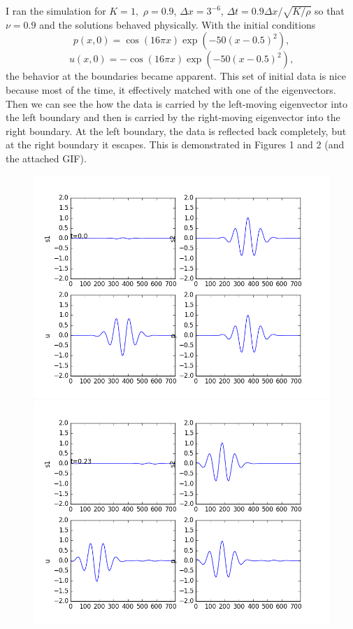\documentclass[12pt]{article}
\begin{document}
\begin{enumerate}[(a)]
I ran the simulation for $K=1,$ $\rho=0.9$, $\Delta x = 3^{-6}$, $\Delta t = 0.9 \Delta x / \sqrt{K/ \rho}$ so that $\nu = 0.9$ and the solutions behaved physically. With the initial conditions
$$p(x,0) = \cos(16\pi x)\exp(-50(x-0.5)^2),$$
$$u(x,0) = -\cos(16\pi x)\exp(-50(x-0.5)^2),$$
the behavior at the boundaries became apparent.  This set of initial data is nice because most of the time, it effectively matched with one of the eigenvectors.  Then we can see the how the data is carried by the left-moving eigenvector into the left boundary and then is carried by the right-moving eigenvector into the right boundary.  At the left boundary, the data is reflected back completely, but at the right boundary it escapes.  This is demonstrated in Figures 1 and 2 (and the attached GIF).

\begin{figure}[H]
\centering\includegraphics[scale=0.4]{acoustic_wavepacket_frames/acoustic_eqn_fig01.png}
\centering\includegraphics[scale=0.4]{acoustic_wavepacket_frames/acoustic_eqn_fig05.png}

\end{figure}
\end{enumerate}
\end{document}
